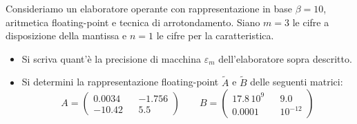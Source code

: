Consideriamo un elaboratore operante con rappresentazione in base
$\beta=10$, aritmetica floating-point e tecnica di arrotondamento.
Siano $m=3$ le cifre a disposizione della mantissa e  $n=1$ le
cifre per la caratteristica.
 \begin{itemize}
 \item
 Si scriva quant'\`{e}
la precisione di macchina $\varepsilon_m$ dell'elaboratore sopra
descritto.

\item
\noindent Si determini la rappresentazione floating-point
$\widetilde{A}$ e $\widetilde{B}$ delle seguenti matrici:
$$
A=\left(
\begin{array}{ccc}
0.0034 && -1.756 \\
-10.42 && 5.5
\end{array}
\right ) \quad \quad B=\left(
\begin{array}{ccc}
17.8\, 10^{9} & & 9.0 \\
0.0001 &  & 10^{-12}
\end{array}
\right )
$$
\end{itemize}
